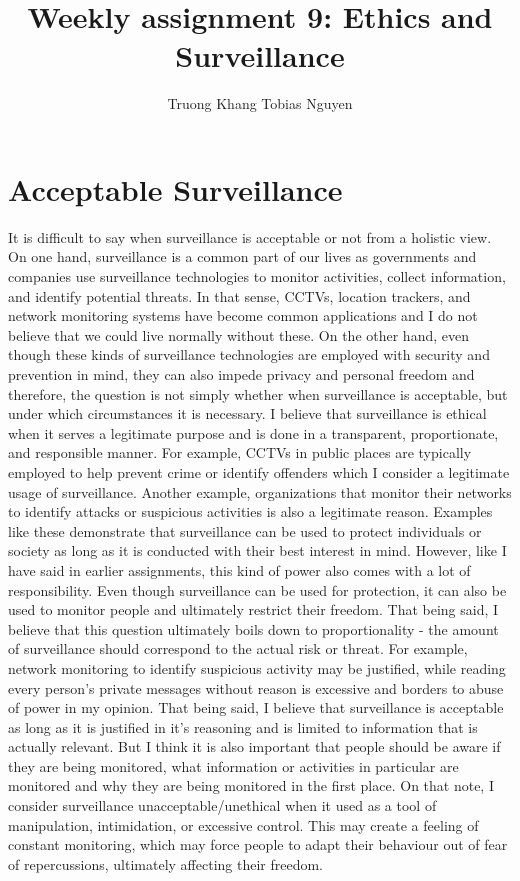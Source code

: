 \documentclass[12pt]{article}
\title{Weekly assignment 9: Ethics and Surveillance}
\author{Truong Khang Tobias Nguyen}
\date{}
\begin{document}
\maketitle

\section{Acceptable Surveillance}
It is difficult to say when surveillance is acceptable or not from a holistic view. On one hand, surveillance is a common part of our lives as governments and companies use surveillance technologies to monitor activities, collect information, and identify potential threats. In that sense, CCTVs, location trackers, and network monitoring systems have become common applications and I do not believe that we could live normally without these.
\newline
On the other hand, even though these kinds of surveillance technologies are employed with security and prevention in mind, they can also impede privacy and personal freedom and therefore, the question is not simply whether when surveillance is acceptable, but under which circumstances it is necessary.
\newline
I believe that surveillance is ethical when it serves a legitimate purpose and is done in a transparent, proportionate, and responsible manner. For example, CCTVs in public places are typically employed to help prevent crime or identify offenders which I consider a legitimate usage of surveillance. Another example, organizations that monitor their networks to identify attacks or suspicious activities is also a legitimate reason. Examples like these demonstrate that surveillance can be used to protect individuals or society as long as it is conducted with their best interest in mind.
\newline
However, like I have said in earlier assignments, this kind of power also comes with a lot of responsibility. Even though surveillance can be used for protection, it can also be used to monitor people and ultimately restrict their freedom. That being said, I believe that this question ultimately boils down to proportionality - the amount of surveillance should correspond to the actual risk or threat. For example, network monitoring to identify suspicious activity may be justified, while reading every person's private messages without reason is excessive and borders to abuse of power in my opinion. That being said, I believe that surveillance is acceptable as long as it is justified in it's reasoning and is limited to information that is actually relevant.
\newline
But I think it is also important that people should be aware if they are being monitored, what information or activities in particular are monitored and why they are being monitored in the first place. On that note, I consider surveillance unacceptable/unethical when it used as a tool of manipulation, intimidation, or excessive control. This may create a feeling of constant monitoring, which may force people to adapt their behaviour out of fear of repercussions, ultimately affecting their freedom.
\end{document}
